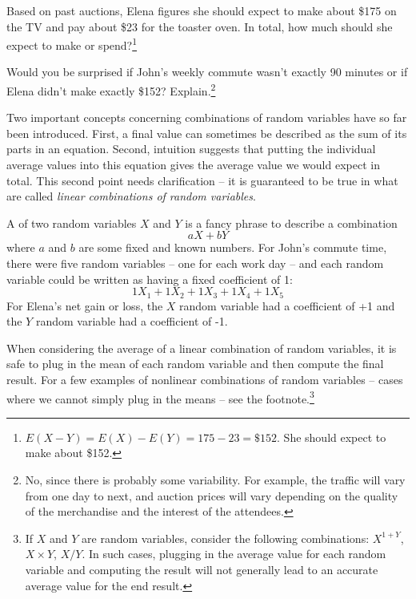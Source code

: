 \begin{exercise}
Based on past auctions, Elena figures she should expect to make about \$175 on the TV and pay about \$23 for the toaster oven. In total, how much should she expect to make or spend?\footnote{$E(X-Y) = E(X) - E(Y) = 175 - 23 = \$152$. She should expect to make about \$152.}
\end{exercise}

\begin{exercise} \label{explainWhyThereIsUncertaintyInTheSum}
Would you be surprised if John's weekly commute wasn't exactly 90 minutes or if Elena didn't make exactly \$152? Explain.\footnote{No, since there is probably some variability. For example, the traffic will vary from one day to next, and auction prices will vary depending on the quality of the merchandise and the interest of the attendees.}
\end{exercise}

Two important concepts concerning combinations of random variables have so far been introduced. First, a final value can sometimes be described as the sum of its parts in an equation. Second, intuition suggests that putting the individual average values into this equation gives the average value we would expect in total. This second point needs clarification -- it is guaranteed to be true in what are called \emph{linear combinations of random variables}.

A  of two random variables $X$ and $Y$ is a fancy phrase to describe a combination
$$ aX + bY$$
where $a$ and $b$ are some fixed and known numbers. For John's commute time, there were five random variables -- one for each work day -- and each random variable could be written as having a fixed coefficient of 1:
$$ 1X_1 + 1 X_2 + 1 X_3 + 1 X_4 + 1 X_5 $$
For Elena's net gain or loss, the $X$ random variable had a coefficient of +1 and the $Y$ random variable had a coefficient of -1.

When considering the average of a linear combination of random variables, it is safe to plug in the mean of each random variable and then compute the final result. For a few examples of nonlinear combinations of random variables -- cases where we cannot simply plug in the means -- see the footnote.\footnote{If $X$ and $Y$ are random variables, consider the following combinations: $X^{1+Y}$, $X\times Y$, $X/Y$. In such cases, plugging in the average value for each random variable and computing the result will not generally lead to an accurate average value for the end result.}

